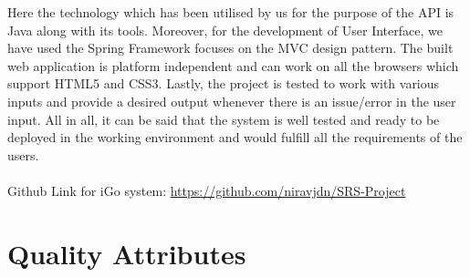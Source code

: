 \documentclass[11pt, english]{report}
\begin{document}
Here the technology which has been utilised by us for the purpose of the API is Java along with its tools. Moreover, for the development of User Interface, we have used the Spring Framework focuses on the MVC design pattern. The built web application is platform independent and can work on all the browsers which support HTML5 and CSS3. Lastly, the project is tested to work with various inputs and provide a desired output whenever there is an issue/error in the user input. All in all, it can be said that the system is well tested and ready to be deployed in the working environment and would fulfill all the requirements of the users.\\ \\
        

Github Link for iGo system: \url{https://github.com/niravjdn/SRS-Project}


\section{Quality Attributes}
\end{document}
